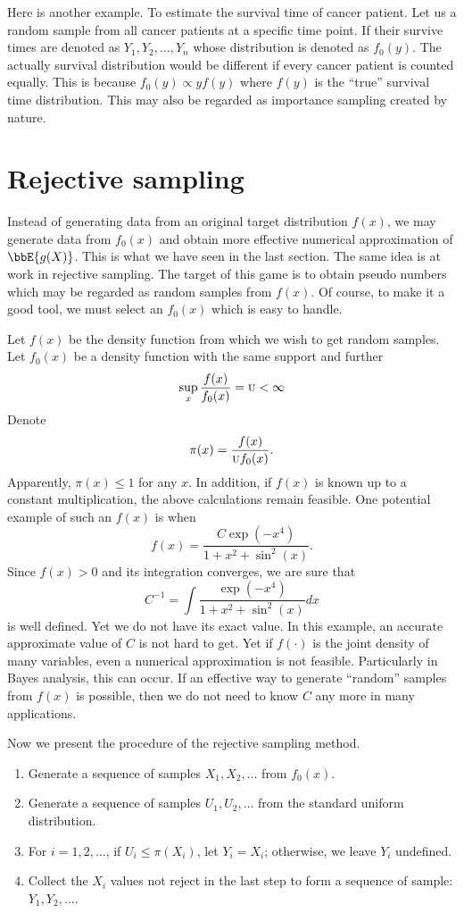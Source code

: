 Here is another example. To estimate the survival time of
cancer patient. Let us a random sample from all cancer patients
at a specific time point. If their survive times are denoted
as $Y_1, Y_2, \ldots, Y_n$ whose distribution is denoted
as $f_0(y)$. The actually survival distribution would be
different if every cancer patient is counted equally.
This is because $f_0(y) \propto y f(y)$ where $f(y)$ is the
``true'' survival time distribution.
This may also be regarded as importance sampling
created by nature.

\section{Rejective sampling}
Instead of generating data from an original target distribution $f(x)$,
we may generate data from $f_0(x)$ and obtain more effective
numerical approximation of $\bbE\{g(X)\}$.
This is what we have seen in the last section.
The same idea is at work in rejective sampling.
The target of this game is to obtain pseudo numbers which
may be regarded as random samples from $f(x)$.
Of course, to make it a good tool, we must select an
$f_0(x)$ which is easy to handle.

Let $f(x)$ be the density function from which we wish to get
random samples. Let $f_0(x)$ be a density function with the
same support and further
\[
\sup_x \frac{f(x)}{f_0(x)} = \mbox{\sc u} < \infty
\]
Denote 
\[
\pi(x) = \frac{f(x)}{\mbox{\sc u} f_0(x)}.
\]
Apparently, $\pi(x) \leq 1$ for any $x$. In addition, if $f(x)$ is known
up to a constant multiplication, the above calculations remain feasible.
One potential example of such an $f(x)$ is when
\[
f(x) = \frac{C \exp( - x^4)}{1+x^2 + \sin^2(x)}.
\]
Since $f(x) > 0$ and its integration converges, we are
sure that 
\[
C^{-1} = \int  \frac{\exp( - x^4)}{1+x^2 + \sin^2(x)}dx 
\]
is well defined. Yet we do not have its exact value.
In this example, an accurate approximate value of $C$ 
is not hard to get. Yet if $f(\cdot)$ is the joint density
of many variables, even a numerical approximation is not
feasible. Particularly in Bayes analysis, this can occur.
If an effective way to generate ``random'' samples
from $f(x)$ is possible, then we do not need to know $C$
any more in many applications.

Now we present the procedure of the rejective sampling method.
\begin{enumerate}
\item
Generate a sequence of \iid samples $X_1, X_2, \ldots$ from $f_0(x)$.

\item
Generate a sequence of \iid samples $U_1, U_2, \ldots$  from the standard uniform
distribution. 

\item
For $i=1, 2, \ldots$, if $U_i \leq \pi(X_i)$, let $Y_i = X_i$; otherwise, we leave $Y_i$
undefined. 

\item
Collect the $X_i$ values not reject in the last step to form 
a sequence of \iid sample: $Y_1, Y_2, \ldots$. 
\end{enumerate}

